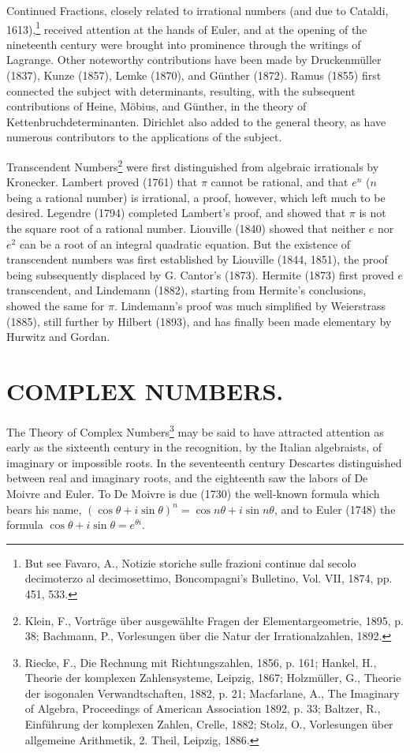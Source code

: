 \documentclass[oneside]{book}
\begin{document}
Continued Fractions, closely related to irrational numbers (and due
to Ca\-tal\-di, 1613),\footnote{But see Favaro, A., Notizie storiche
sulle frazioni continue dal secolo decimoterzo al decimosettimo,
Boncompagni's Bulletino, Vol. VII, 1874, pp. 451, 533.} received
attention at the hands of Euler, and at the opening of the
nineteenth century were brought into prominence through the writings
of Lagrange. Other noteworthy contributions have been made by
Druckenm\"uller (1837), Kunze (1857), Lemke (1870), and G\"unther
(1872). Ramus (1855) first connected the subject with determinants,
resulting, with the subsequent contributions of Heine, M\"obius, and
G\"unther, in the theory of Kettenbruchdeterminanten. Dirichlet
also added to the general theory, as have numerous contributors to
the applications of the subject.

Transcendent Numbers\footnote{Klein, F., Vortr\"age \"uber
ausgew\"ahlte Fragen der Elementargeometrie, 1895, p. 38; Bachmann,
P., Vorlesungen \"uber die Natur der Irrationalzahlen, 1892.} were
first distinguished from algebraic irrationals by
Kronecker. Lambert proved (1761) that $\pi$ cannot be rational, and
that $e^n$ ($n$ being a rational number) is irrational, a proof,
however, which left much to be desired. Legendre (1794) completed
Lambert's proof, and showed that $\pi$ is not the square root of a
rational number. Liouville (1840) showed that neither $e$ nor
$e^2$ can be a root of an integral quadratic equation. But the
existence of transcendent numbers was first established by Liouville
(1844, 1851), the proof being subsequently displaced by G. Cantor's
(1873). Hermite (1873) first proved $e$ transcendent, and Lindemann
(1882), starting from Hermite's conclusions, showed the same for
$\pi$. Lindemann's proof was much simplified by Weierstrass (1885),
still further by Hilbert (1893), and has finally been made
elementary by Hurwitz and Gordan.

\chapter{COMPLEX NUMBERS.}

The Theory of Complex Numbers\footnote{Riecke, F., Die Rechnung mit
Richtungszahlen, 1856, p. 161; Hankel, H., Theorie der komplexen
Zahlensysteme, Leipzig, 1867; Holzm\"uller, G., Theorie der
isogonalen Verwandtschaften, 1882, p. 21; Macfarlane, A., The
Imaginary of Algebra, Proceedings of American Association 1892,
p. 33; Baltzer, R., Einf\"uhrung der komplexen Zahlen, Crelle, 1882;
Stolz, O., Vorlesungen \"uber allgemeine Arithmetik, 2. Theil,
Leipzig, 1886.} may be said to have attracted attention as early as
the sixteenth century in the recognition, by the Italian
algebraists, of imaginary or impossible roots. In the seventeenth
century Descartes distinguished between real and imaginary roots,
and the eighteenth saw the labors of De Moivre and Euler. To De
Moivre is due (1730) the well-known formula which bears his name,
$(\cos \theta + i \sin
\theta)^{n} = \cos n \theta + i \sin n \theta$, and to Euler (1748)
the formula $\cos \theta + i \sin \theta = e ^{\theta i}$.
\end{document}
